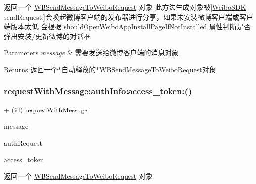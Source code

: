 返回一个 \mbox{\hyperlink{interface_w_b_send_message_to_weibo_request}{W\+B\+Send\+Message\+To\+Weibo\+Request}} 对象 此方法生成对象被\mbox{[}\mbox{\hyperlink{interface_weibo_s_d_k}{Weibo\+S\+DK}} send\+Request\+:\mbox{]}会唤起微博客户端的发布器进行分享，如果未安装微博客户端或客户端版本太低 会根据 should\+Open\+Weibo\+App\+Install\+Page\+If\+Not\+Installed 属性判断是否弹出安装/更新微博的对话框 
\begin{DoxyParams}{Parameters}
{\em message} & 需要发送给微博客户端的消息对象 \\
\hline
\end{DoxyParams}
\begin{DoxyReturn}{Returns}
返回一个$\ast$自动释放的$\ast$\+W\+B\+Send\+Message\+To\+Weibo\+Request对象 
\end{DoxyReturn}
\mbox{\label{interface_w_b_send_message_to_weibo_request_a5e6bfaa6c972f6687d6683a95567d3ce}} 
\subsubsection{\texorpdfstring{request\+With\+Message\+:auth\+Info\+:access\+\_\+token\+:()}{requestWithMessage:authInfo:access\_token:()}\hspace{0.1cm}{\footnotesize\ttfamily [1/3]}}
{\footnotesize\ttfamily + (id) \mbox{\hyperlink{interface_w_b_send_message_to_weibo_request_af6ff893011c578e7351d4f35b542fb41}{request\+With\+Message\+:}} \begin{DoxyParamCaption}\item[{(\mbox{\hyperlink{interface_w_b_message_object}{W\+B\+Message\+Object}} $\ast$)}]{message }\item[{authInfo:(\mbox{\hyperlink{interface_w_b_authorize_request}{W\+B\+Authorize\+Request}} $\ast$)}]{auth\+Request }\item[{access_token:(N\+S\+String $\ast$)}]{access\+\_\+token }\end{DoxyParamCaption}}

返回一个 \mbox{\hyperlink{interface_w_b_send_message_to_weibo_request}{W\+B\+Send\+Message\+To\+Weibo\+Request}} 对象


